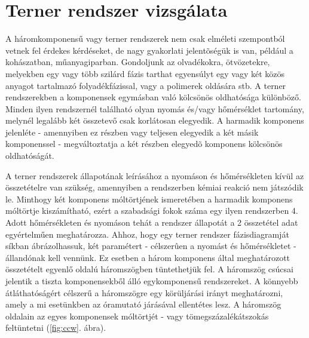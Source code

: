 \documentclass[a4paper, 12pt]{article}
\begin{document}
\section{Terner rendszer vizsgálata}
A háromkomponensű vagy terner rendszerek nem csak elméleti szempontból vetnek fel érdekes kérdéseket, de nagy gyakorlati jelentõségük is van, például a kohászatban, műanyagiparban.
Gondoljunk az olvadékokra, ötvözetekre, melyekben egy vagy több szilárd fázis tarthat egyensúlyt egy vagy két közös anyagot tartalmazó folyadékfázissal, vagy a polimerek oldására stb.
A terner rendszerekben a komponensek egymásban való kölcsönös oldhatósága különböző.
Minden ilyen rendszernél található olyan nyomás és/vagy hőmérséklet tartomány, melynél legalább két összetevő csak korlátosan elegyedik.
A harmadik komponens jelenléte - amennyiben ez részben vagy teljesen elegyedik a két másik komponenssel - megváltoztatja a két részben elegyedõ komponens kölcsönös oldhatóságát.

A terner rendszerek állapotának leírásához a nyomáson és hőmérsékleten kívül az összetételre van szükség, amennyiben a rendszerben kémiai reakció nem játszódik le.
Minthogy két komponens móltörtjének ismeretében a harmadik komponens móltörtje kiszámítható, ezért a szabadsági fokok száma egy ilyen rendszerben 4.
Adott hőmérsékleten és nyomáson tehát a rendszer állapotát a 2 összetétel adat egyértelműen meghatározza.
Ahhoz, hogy egy terner rendszer fázisdiagramját síkban ábrázolhassuk, két paramétert - célszerûen a nyomást és hőmérsékletet - állandónak kell vennünk.
Ez esetben a három komponens által meghatározott összetételt egyenlő oldalú háromszögben tüntethetjük fel.
A háromszög csúcsai jelentik a tiszta komponensekből álló egykomponensű rendszereket.
A könnyebb átláthatóságért célszerű a háromszögre egy körüljárási irányt meghatározni, amely a mi esetünkben az óramutató járásával ellentétes lesz. A háromszög oldalain az egyes komponensek móltörtjét - vagy tömegszázalékátszokás feltüntetni (\ref{fig:ccw}. ábra).
\end{document}
